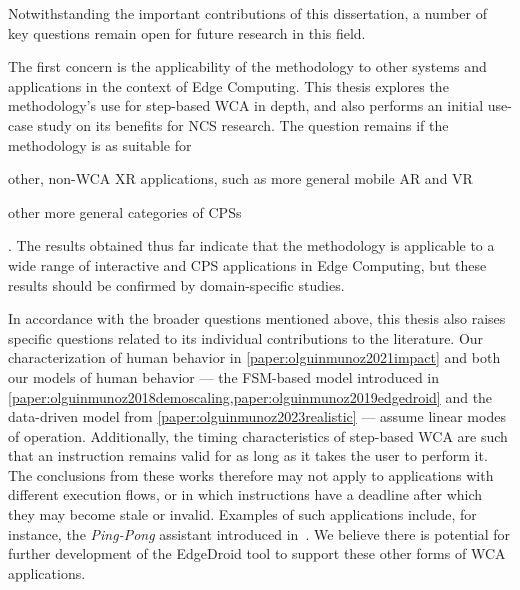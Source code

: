 \medskip

Notwithstanding the important contributions of this dissertation, a number of key questions remain open for future research in this field.

The first concern is the applicability of the methodology to other systems and applications in the context of Edge Computing.
This thesis explores the methodology's use for step-based \gls{WCA} in depth, and also performs an initial use-case study on its benefits for \gls{NCS} research.
The question remains if the methodology is as suitable for
\begin{inlineenum}
    \item other, non-\gls{WCA} \gls{XR} applications, such as more general mobile \gls{AR} and \gls{VR}
    \item other more general categories of \glspl{CPS}
\end{inlineenum}.
The results obtained thus far indicate that the methodology is applicable to a wide range of interactive and \gls{CPS} applications in Edge Computing, but these results should be confirmed by domain-specific studies.

In accordance with the broader questions mentioned above, this thesis also raises specific questions related to its individual contributions to the literature.
Our characterization of human behavior in \cref{paper:olguinmunoz2021impact} and both our models of human behavior --- the \gls{FSM}-based model introduced in \cref{paper:olguinmunoz2018demoscaling,paper:olguinmunoz2019edgedroid} and the data-driven model from \cref{paper:olguinmunoz2023realistic} --- assume linear modes of operation.
Additionally, the timing characteristics of step-based \gls{WCA} are such that an instruction remains valid for as long as it takes the user to perform it.
The conclusions from these works therefore may not apply to applications with different execution flows, or in which instructions have a deadline after which they may become stale or invalid.
Examples of such applications include, for instance, the \emph{Ping-Pong} assistant introduced in~\cite{chen2015early}.
We believe there is potential for further development of the EdgeDroid tool to support these other forms of \gls{WCA} applications.

